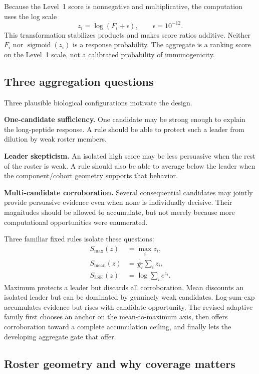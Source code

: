 \documentclass[11pt]{article}
\newcommand{\sigmoid}{\operatorname{sigmoid}}
\newcommand{\LSE}{\operatorname{LSE}}
\begin{document}
Because the Level~1 score is nonnegative and multiplicative, the computation
uses the log scale
\begin{equation}
z_i=\log(F_i+\epsilon),\qquad \epsilon=10^{-12}.
\end{equation}
This transformation stabilizes products and makes score ratios additive.
Neither $F_i$ nor $\sigmoid(z_i)$ is a response probability. The aggregate is
a ranking score on the Level~1 scale, not a calibrated probability of
immunogenicity.

\subsection{Three aggregation questions}

Three plausible biological configurations motivate the design.

\textbf{One-candidate sufficiency.}
One candidate may be strong enough to explain the long-peptide response. A
rule should be able to protect such a leader from dilution by weak roster
members.

\textbf{Leader skepticism.}
An isolated high score may be less persuasive when the rest of the roster is
weak. A rule should also be able to average below the leader when the
component/cohort geometry supports that behavior.

\textbf{Multi-candidate corroboration.}
Several consequential candidates may jointly provide persuasive evidence even
when none is individually decisive. Their magnitudes should be allowed to
accumulate, but not merely because more computational opportunities were
enumerated.

Three familiar fixed rules isolate these questions:
\begin{align}
S_{\max}(z)&=\max_i z_i,\\
S_{\mathrm{mean}}(z)&=\frac{1}{K_\ell}\sum_i z_i,\\
S_{\LSE}(z)&=\log\sum_i e^{z_i}.
\end{align}
Maximum protects a leader but discards all corroboration. Mean discounts an
isolated leader but can be dominated by genuinely weak candidates.
Log-sum-exp accumulates evidence but rises with candidate opportunity. The
revised adaptive family first chooses an anchor on the mean-to-maximum axis,
then offers corroboration toward a complete accumulation ceiling, and finally
lets the developing aggregate gate that offer.

\subsection{Roster geometry and why coverage matters}
\end{document}
